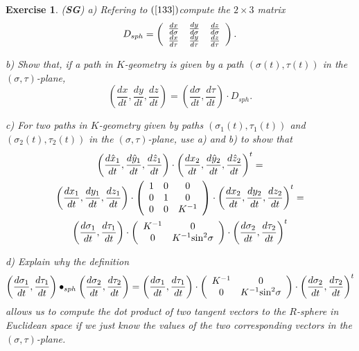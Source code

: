\documentclass{article}%
\newtheorem{exercise}[theorem]{Exercise}
\begin{document}
\begin{exercise}
\label{3333}(\textbf{SG}) a) Refering to $\left(  \ref{133}\right)  $compute
the $2\times3$ matrix
\[
D_{sph}=\left(
\begin{array}
[c]{ccc}%
\frac{dx}{d\sigma} & \frac{dy}{d\sigma} & \frac{dz}{d\sigma}\\
\frac{dx}{d\tau} & \frac{dy}{d\tau} & \frac{dz}{d\tau}%
\end{array}
\right)  .
\]


b) Show that, if a path in $K$-geometry is given by a path $\left(
\sigma\left(  t\right)  ,\tau\left(  t\right)  \right)  $ in the $\left(
\sigma,\tau\right)  $-plane,%
\[
\left(  \frac{dx}{dt},\frac{dy}{dt},\frac{dz}{dt}\right)  =\left(
\frac{d\sigma}{dt},\frac{d\tau}{dt}\right)  \cdot D_{sph}.
\]


c) For two paths in $K$-geometry given by paths $\left(  \sigma_{1}\left(
t\right)  ,\tau_{1}\left(  t\right)  \right)  $ and $\left(  \sigma_{2}\left(
t\right)  ,\tau_{2}\left(  t\right)  \right)  $ in the $\left(  \sigma
,\tau\right)  $-plane, use a) and b) to show that
\begin{gather*}
\left(  \frac{d\hat{x}_{1}}{dt},\frac{d\hat{y}_{1}}{dt},\frac{d\hat{z}_{1}%
}{dt}\right)  \cdot\left(  \frac{dx_{2}}{dt},\frac{d\hat{y}_{2}}{dt}%
,\frac{d\hat{z}_{2}}{dt}\right)  ^{t}=\\
\left(  \frac{dx_{1}}{dt},\frac{dy_{1}}{dt},\frac{dz_{1}}{dt}\right)
\cdot\left(
\begin{array}
[c]{ccc}%
1 & 0 & 0\\
0 & 1 & 0\\
0 & 0 & K^{-1}%
\end{array}
\right)  \cdot\left(  \frac{dx_{2}}{dt},\frac{dy_{2}}{dt},\frac{dz_{2}}%
{dt}\right)  ^{t}=\\
\left(  \frac{d\sigma_{1}}{dt},\frac{d\tau_{1}}{dt}\right)  \cdot\left(
\begin{array}
[c]{cc}%
K^{-1} & 0\\
0 & K^{-1}\mathrm{sin}^{2}\sigma
\end{array}
\right)  \cdot\left(  \frac{d\sigma_{2}}{dt},\frac{d\tau_{2}}{dt}\right)  ^{t}%
\end{gather*}


d) Explain why the definition%
\[
\left(  \frac{d\sigma_{1}}{dt},\frac{d\tau_{1}}{dt}\right)  \bullet
_{sph}\left(  \frac{d\sigma_{2}}{dt},\frac{d\tau_{2}}{dt}\right)  =\left(
\frac{d\sigma_{1}}{dt},\frac{d\tau_{1}}{dt}\right)  \cdot\left(
\begin{array}
[c]{cc}%
K^{-1} & 0\\
0 & K^{-1}\mathrm{sin}^{2}\sigma
\end{array}
\right)  \cdot\left(  \frac{d\sigma_{2}}{dt},\frac{d\tau_{2}}{dt}\right)  ^{t}%
\]
allows us to compute the dot product of two tangent vectors to the $R$-sphere
in Euclidean space if we just know the values of the two corresponding vectors
in the $\left(  \sigma,\tau\right)  $-plane.
\end{exercise}
\end{document}
